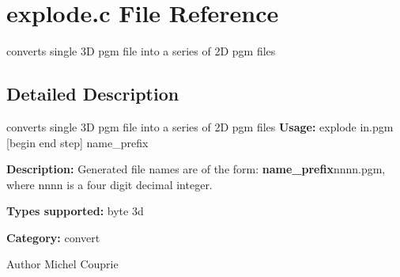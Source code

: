 \section{explode.c File Reference}
\label{explode_8c}


converts single 3D pgm file into a series of 2D pgm files  




\subsection{Detailed Description}
converts single 3D pgm file into a series of 2D pgm files {\bfseries Usage:} explode in.pgm [begin end step] name\_\-prefix

{\bfseries Description:} Generated file names are of the form: {\bfseries name\_\-prefix}nnnn.pgm, where nnnn is a four digit decimal integer.

{\bfseries Types supported:} byte 3d

{\bfseries Category:} convert

\begin{DoxyAuthor}{Author}
Michel Couprie 
\end{DoxyAuthor}
